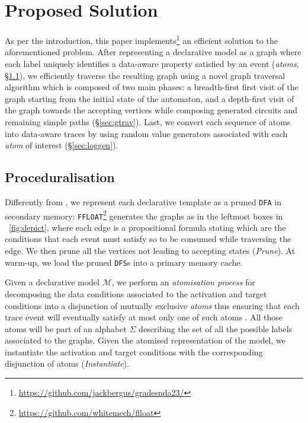\documentclass[acmengage]{acmart}
\begin{document}
\section{Proposed Solution}\label{sec:algo}
As per the introduction, this paper implements\footnote{\url{https://github.com/jackbergus/gradesnda23/}}  an efficient solution to the aforementioned problem. After representing a declarative model as a graph where each label uniquely identifies a data-aware property satisfied by an event (\textit{atoms}, \S\ref{sec:ODFAgen}), we efficiently traverse the resulting graph using a novel graph traversal algorithm which is composed of two main phases: a breadth-first first visit of the graph starting from the initial state of the automaton, and a depth-first visit of the graph towards the accepting vertices while composing generated circuits and remaining simple paths (\S\ref{sec:gtrav}). Last, we convert each sequence of atoms into data-aware traces by using random value generators associated with each \textit{atom} of interest (\S\ref{sec:loggen}).




\subsection{Proceduralisation}\label{sec:ODFAgen}
Differently from \cite{DBLP:conf/caise/CiccioBCM15}, we represent each declarative template  as a pruned \texttt{DFA} in secondary memory: \texttt{FFLOAT}\footnote{\url{https://github.com/whitemech/flloat}} \cite{FLLOAT1}  generates the graphs as in the leftmost boxes in \figurename~\ref{fig:depict}, where each edge is a propositional formula stating which are the conditions that each event must satisfy so to be consumed while traversing the edge. We then prune all the vertices not leading to accepting states (\textit{Prune}). At warm-up, we load the pruned \texttt{DFS}s into a primary memory cache. 

Given a declarative model $\mathcal{M}$, %
we %
perform an \textit{atomisation process} for %
decomposing the data conditions associated to the activation and target conditions into a disjunction of mutually exclusive \textit{atoms} thus ensuring that each trace event will eventually satisfy at most only one of such atoms  \cite{DBLP:conf/bpm/BergamiMMM21}. All those atoms will be part of an alphabet $\Sigma$ describing the set of all the possible labels associated to the graphs. %
Given the atomised representation of the model, we  instantiate the activation and target conditions with the corresponding disjunction of atoms %
(\textit{Instantiate}). 
\end{document}
